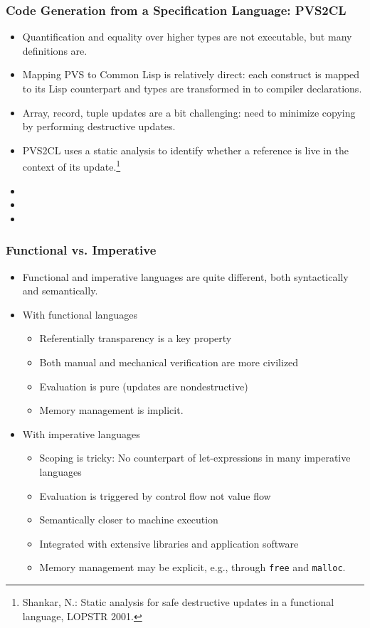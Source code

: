 \documentclass[xcolor=dvipsnames]{beamer}
\begin{document}
\begin{frame}[fragile]
\frametitle{Code Generation from a Specification Language: PVS2CL}
\begin{itemize}
\item Quantification and equality over higher types are not executable, but many definitions are. 
\item Mapping PVS to Common Lisp is relatively direct: each construct is mapped to its Lisp counterpart
and types are transformed in to compiler declarations. 
\item Array, record, tuple updates are a bit challenging: need to
minimize copying by performing destructive updates.  
\item PVS2CL uses a static analysis to identify whether a reference is live in the context of
its update.\footnote{Shankar, N.: Static analysis for safe destructive updates in a functional language, LOPSTR 2001.}
\item %
{}
\item {}
\item {}
\end{itemize}
\end{frame}


\begin{frame}[fragile]
\frametitle{Functional vs. Imperative}
\begin{itemize}
\item Functional and imperative languages are quite different, both syntactically and semantically. 
\item %
With functional languages 
\begin{itemize}
\item Referentially transparency is a key property
\item Both manual and mechanical verification are more civilized
\item Evaluation is pure (updates are nondestructive)
\item  Memory management is implicit.
\end{itemize}
\item %
With imperative languages
\begin{itemize}
\item Scoping is tricky:  No counterpart of let-expressions in many imperative languages
\item Evaluation is triggered by control flow not value flow
\item Semantically closer to machine execution
\item Integrated with extensive libraries and application software
\item Memory management may be explicit, e.g., through \texttt{free} and \texttt{malloc}. 
\end{itemize}
\end{itemize}
\end{frame}
\end{document}
